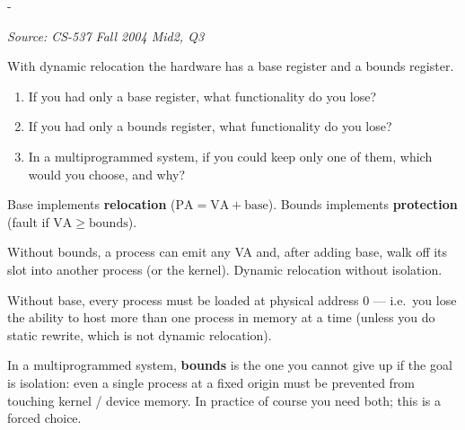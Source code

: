 \documentclass[11pt,a4paper]{article}
\makeatletter
\newcommand{\keepspace}[1]{\par\penalty-100\begingroup
  \setlength{\dimen@}{#1}\dimen@ii\pagegoal\advance\dimen@ii-\pagetotal
  \ifdim\dimen@>\dimen@ii\ifdim\dimen@ii>\z@\vfil\fi\break\fi\endgroup}
\newcounter{qn}[section]
\newenvironment{Qn}[4]{%
  \refstepcounter{qn}\keepspace{7\baselineskip}%
  \begin{tcolorbox}[qboxstyle, title={Q\thesection.\theqn\ \ [#1 \textbar\ #2]\ \ #4}]%
  {\footnotesize\color{g3}\textit{Source: #3}}\par\smallskip%
}{%
  \end{tcolorbox}%
}
\newenvironment{Sol}{%
  \begin{tcolorbox}[sboxstyle, title={Solution}]%
}{%
  \end{tcolorbox}\vspace{0.35em}%
}
\makeatother
\begin{document}
\begin{Qn}{Medium}{Lect 9}{CS-537 Fall 2004 Mid2, Q3}{Lose the bounds register, or lose the base?}
With dynamic relocation the hardware has a base register and a bounds
register.
\begin{enumerate}
  \item If you had only a base register, what functionality do you
        lose?
  \item If you had only a bounds register, what functionality do you
        lose?
  \item In a multiprogrammed system, if you could keep only one of
        them, which would you choose, and why?
\end{enumerate}
\end{Qn}
\begin{Sol}
Base implements \textbf{relocation} ($\mathrm{PA}=\mathrm{VA}+\mathrm{base}$).
Bounds implements \textbf{protection} (fault if $\mathrm{VA}\ge\mathrm{bounds}$).

Without bounds, a process can emit any VA and, after adding base, walk
off its slot into another process (or the kernel). Dynamic relocation
without isolation.

Without base, every process must be loaded at physical address $0$
--- i.e.\ you lose the ability to host more than one process in
memory at a time (unless you do static rewrite, which is not dynamic
relocation).

In a multiprogrammed system, \textbf{bounds} is the one you cannot
give up if the goal is isolation: even a single process at a fixed
origin must be prevented from touching kernel / device memory. In
practice of course you need both; this is a forced choice.
\end{Sol}
\end{document}

